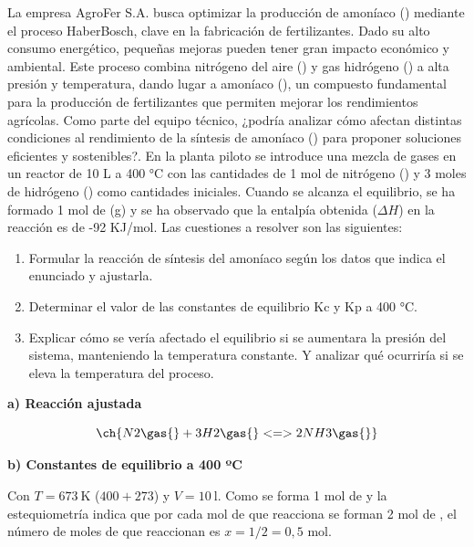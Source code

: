 \begin{exerciseEVAU}

    La empresa AgroFer S.A. busca optimizar la producción de amoníaco () mediante el proceso HaberBosch, clave en la fabricación de fertilizantes. Dado su alto consumo energético, pequeñas mejoras pueden tener gran impacto económico y ambiental. Este proceso combina nitrógeno del aire () y gas hidrógeno () a alta presión y temperatura, dando lugar a amoníaco (), un compuesto fundamental para la producción de fertilizantes que permiten mejorar los rendimientos agrícolas. Como parte del equipo técnico, ¿podría analizar cómo afectan distintas condiciones al rendimiento de la síntesis de amoníaco () para proponer soluciones eficientes y sostenibles?. En la planta piloto se introduce una mezcla de gases en un reactor de 10 L a 400 °C con las cantidades de 1 mol de nitrógeno () y 3 moles de hidrógeno () como cantidades iniciales. Cuando se alcanza el equilibrio, se ha formado 1 mol de  (g) y se ha observado que la entalpía obtenida (\( \Delta H \)) en la reacción es de -92 KJ/mol.
    Las cuestiones a resolver son las siguientes:
    \begin{enumerate}[label=\letraminuscula]
        \item Formular la reacción de síntesis del amoníaco según los datos que indica el enunciado
        y ajustarla.
        \item Determinar el valor de las constantes de equilibrio Kc y Kp a 400 °C.
        \item Explicar cómo se vería afectado el equilibrio si se aumentara la presión del sistema,
        manteniendo la temperatura constante. Y analizar qué ocurriría si se eleva la temperatura del
        proceso.
    \end{enumerate}

    \begin{solu}

        \textbf{a) Reacción ajustada}

        \begin{equation*}
            \ch{N2 \gas{} + 3 H2 \gas{} <=> 2 NH3 \gas{}}
        \end{equation*}

        \textbf{b) Constantes de equilibrio a 400 ºC}

        Con \(T = \SI{673}{\kelvin}\) (\(400+273\)) y \(V = \SI{10}{\litre}\). Como se forma 1 mol de  y la estequiometría indica que por cada mol de  que reacciona se forman 2 mol de , el número de moles de  que reaccionan es \(x = 1/2 = 0,5\) mol.


\end{solu}
\end{exerciseEVAU}
